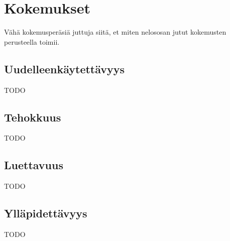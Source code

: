 \vspace{21.5pt}
\chapter{Kokemukset}

Vähä kokemusperäsiä juttuja siitä, et miten nelososan jutut kokemusten perusteella toimii.

\section{Uudelleenkäytettävyys}
TODO
\section{Tehokkuus}
TODO
\section{Luettavuus}
TODO
\section{Ylläpidettävyys}
TODO